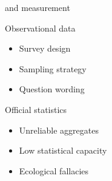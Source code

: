 \documentclass[t]{beamer}
\begin{document}
  \begin{frame}[t]{ and measurement}
    
    \begin{block}{Observational data}

      \begin{itemize}
        \item Survey design
        \item Sampling strategy
        \item Question wording
      \end{itemize}
    
    \end{block}

    \begin{block}{Official statistics}
    
      \begin{itemize}

        \item Unreliable aggregates       %
        \item Low statistical capacity    %
				\item Ecological fallacies				%

      \end{itemize}

    \end{block}
        
  \end{frame}
  
\end{document}
